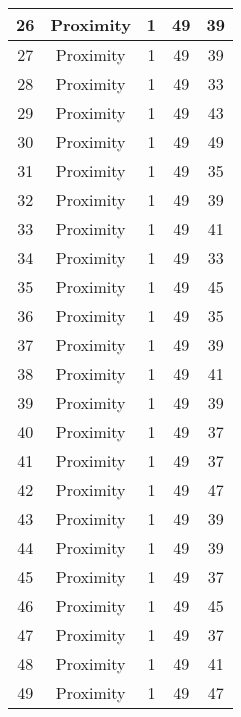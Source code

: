 \documentclass[results.tex]{subfiles}
\begin{document}
\begin{center}
\begin{tabular}{| c || c | c | c | c |}
    \hline
    26 & Proximity & 1 & 49 & 39 \\ 
    \hline
    27 & Proximity & 1 & 49 & 39 \\ 
    \hline
    28 & Proximity & 1 & 49 & 33 \\ 
    \hline
    29 & Proximity & 1 & 49 & 43 \\ 
    \hline
    30 & Proximity & 1 & 49 & 49 \\ 
    \hline
    31 & Proximity & 1 & 49 & 35 \\ 
    \hline
    32 & Proximity & 1 & 49 & 39 \\ 
    \hline
    33 & Proximity & 1 & 49 & 41 \\ 
    \hline
    34 & Proximity & 1 & 49 & 33 \\ 
    \hline
    35 & Proximity & 1 & 49 & 45 \\ 
    \hline
    36 & Proximity & 1 & 49 & 35 \\ 
    \hline
    37 & Proximity & 1 & 49 & 39 \\ 
    \hline
    38 & Proximity & 1 & 49 & 41 \\ 
    \hline
    39 & Proximity & 1 & 49 & 39 \\ 
    \hline
    40 & Proximity & 1 & 49 & 37 \\ 
    \hline
    41 & Proximity & 1 & 49 & 37 \\ 
    \hline
    42 & Proximity & 1 & 49 & 47 \\ 
    \hline
    43 & Proximity & 1 & 49 & 39 \\ 
    \hline
    44 & Proximity & 1 & 49 & 39 \\ 
    \hline
    45 & Proximity & 1 & 49 & 37 \\ 
    \hline
    46 & Proximity & 1 & 49 & 45 \\ 
    \hline
    47 & Proximity & 1 & 49 & 37 \\ 
    \hline
    48 & Proximity & 1 & 49 & 41 \\ 
    \hline
    49 & Proximity & 1 & 49 & 47 \\ 
    \hline   \end{tabular}
\end{center}
\end{document}
